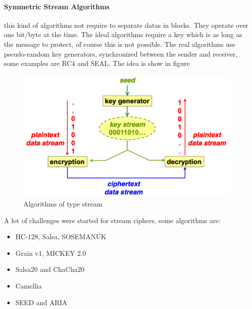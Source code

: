 \documentclass[12pt]{article}
\begin{document}
\paragraph{Symmetric Stream Algorithms} this kind of algorithms not require to separate datas in blocks. They operate over one bit/byte at the time. The ideal algorithms require a key which is as long as the message to protect, of course this is not possible. The real algorithms use pseudo-random key generators, synchronized between the sender and receiver, some examples are RC4 and SEAL. The idea is show in figure
\begin{figure}[H]
   \centering
   \includegraphics[width=\linewidth]{images/stream.png}
   \caption{Algorithms of type stream}
   \label{fig:stream}
\end{figure}
A lot of challenges were started for stream ciphers, some algorithms are:
\begin{itemize}
  \item HC-128, Salsa, SOSEMANUK
  \item Grain v1, MICKEY 2.0
  \item Salsa20 and ChaCha20
  \item Camellia
  \item SEED and ARIA
\end{itemize}
\end{document}
